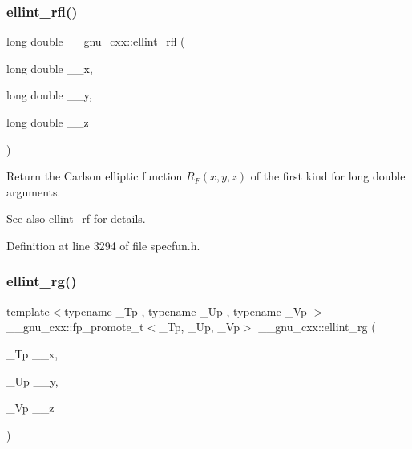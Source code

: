 \mbox{\label{group__gnu__math__spec__func_ga38dd36b3db5bbe5da516d0cbe3ff1f21}} 
\subsubsection{\texorpdfstring{ellint\+\_\+rfl()}{ellint\_rfl()}}
{\footnotesize\ttfamily long double \+\_\+\+\_\+gnu\+\_\+cxx\+::ellint\+\_\+rfl (\begin{DoxyParamCaption}\item[{long double}]{\+\_\+\+\_\+x,  }\item[{long double}]{\+\_\+\+\_\+y,  }\item[{long double}]{\+\_\+\+\_\+z }\end{DoxyParamCaption})\hspace{0.3cm}{\ttfamily [inline]}}

Return the Carlson elliptic function $ R_F(x,y,z) $ of the first kind for {\ttfamily long double} arguments.

\begin{DoxySeeAlso}{See also}
\hyperlink{group__gnu__math__spec__func_gae4859494464c7eaf98193f92b2235bc1}{ellint\+\_\+rf} for details. 
\end{DoxySeeAlso}


Definition at line 3294 of file specfun.\+h.

\mbox{\label{group__gnu__math__spec__func_gadf618529d6106c1c1bc1e9212c4fed12}} 
\subsubsection{\texorpdfstring{ellint\+\_\+rg()}{ellint\_rg()}}
{\footnotesize\ttfamily template$<$typename \+\_\+\+Tp , typename \+\_\+\+Up , typename \+\_\+\+Vp $>$ \\
\+\_\+\+\_\+gnu\+\_\+cxx\+::fp\+\_\+promote\+\_\+t$<$\+\_\+\+Tp, \+\_\+\+Up, \+\_\+\+Vp$>$ \+\_\+\+\_\+gnu\+\_\+cxx\+::ellint\+\_\+rg (\begin{DoxyParamCaption}\item[{\+\_\+\+Tp}]{\+\_\+\+\_\+x,  }\item[{\+\_\+\+Up}]{\+\_\+\+\_\+y,  }\item[{\+\_\+\+Vp}]{\+\_\+\+\_\+z }\end{DoxyParamCaption})\hspace{0.3cm}{\ttfamily [inline]}}

